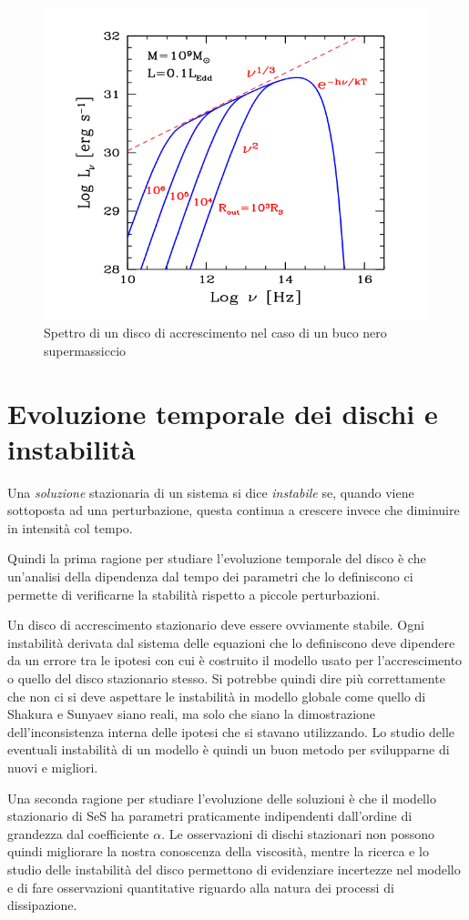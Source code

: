 \documentclass[a4paperbi]{article}
\begin{document}
	\begin{figure}[H]
		\centering
		\includegraphics[width=0.7\linewidth]{SpettroDiscoGhisellini}
		\caption{Spettro di un disco di accrescimento nel caso di un buco nero supermassiccio}
		\label{fig:SpettroDiscoGhisellini}
	\end{figure}	
		
\newpage
\section{Evoluzione temporale dei dischi e instabilità}
	Una \textit{soluzione} stazionaria di un sistema si dice \textit{instabile} se, quando viene sottoposta ad una perturbazione, questa continua a crescere invece che diminuire in intensità col tempo.

	Quindi la prima ragione per studiare l'evoluzione temporale del disco è che un'analisi della dipendenza dal tempo dei parametri che lo definiscono ci permette di verificarne la stabilità rispetto a piccole perturbazioni. 
	
	Un disco di accrescimento stazionario deve essere ovviamente stabile. Ogni instabilità derivata dal sistema delle equazioni che lo definiscono deve dipendere da un errore tra le ipotesi con cui è costruito il modello usato per l'accrescimento o quello del disco stazionario stesso. Si potrebbe quindi dire più correttamente che non ci si deve aspettare le instabilità in modello globale come quello di Shakura e Sunyaev siano reali, ma solo che siano la dimostrazione dell'inconsistenza interna delle ipotesi che si stavano utilizzando. Lo studio delle eventuali instabilità di un modello è quindi un buon metodo per svilupparne di nuovi e migliori.
	
	Una seconda ragione per studiare l'evoluzione delle soluzioni è che il modello stazionario di SeS ha parametri praticamente indipendenti dall'ordine di grandezza dal coefficiente $\alpha$. Le osservazioni di dischi stazionari non possono quindi migliorare la nostra conoscenza della viscosità, mentre la ricerca e lo studio delle instabilità del disco permettono di evidenziare incertezze nel modello e di fare osservazioni quantitative riguardo alla natura dei processi di dissipazione.
	
\end{document}
